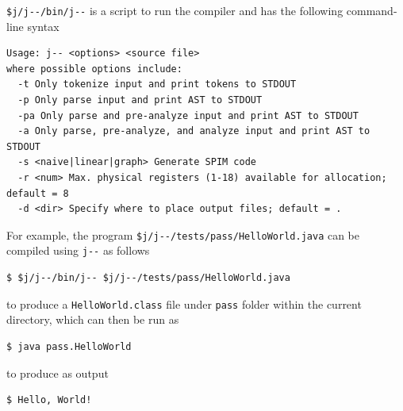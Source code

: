 \documentclass[8pt,a4paper,compress]{beamer}
\begin{document}
\begin{frame}[fragile]
\pause

\lstinline{$j/j--/bin/j--} is a script to run the compiler and has the following command-line
syntax
\begin{lstlisting}[language={}]
Usage: j-- <options> <source file>
where possible options include:
  -t Only tokenize input and print tokens to STDOUT
  -p Only parse input and print AST to STDOUT
  -pa Only parse and pre-analyze input and print AST to STDOUT
  -a Only parse, pre-analyze, and analyze input and print AST to STDOUT
  -s <naive|linear|graph> Generate SPIM code
  -r <num> Max. physical registers (1-18) available for allocation; default = 8
  -d <dir> Specify where to place output files; default = .
\end{lstlisting}

\pause
\bigskip

For example, the \jmm program \lstinline{$j/j--/tests/pass/HelloWorld.java} can be compiled
using \lstinline{j--} as follows

\begin{lstlisting}[language={}]
$ $j/j--/bin/j-- $j/j--/tests/pass/HelloWorld.java
\end{lstlisting}

to produce a \lstinline{HelloWorld.class} file under \lstinline{pass} folder within the current directory, which can then be run as

\begin{lstlisting}[language={}]
$ java pass.HelloWorld
\end{lstlisting}

to produce as output

\begin{lstlisting}[language={}]
$ Hello, World!
\end{lstlisting}
\end{frame}
\end{document}
